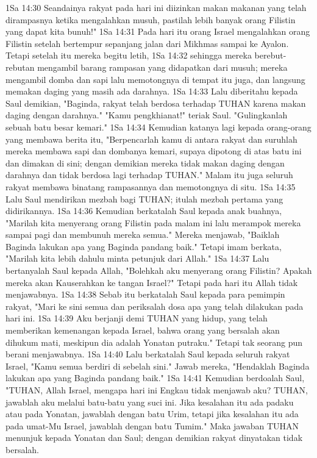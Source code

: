 1Sa 14:30  Seandainya rakyat pada hari ini diizinkan makan makanan yang telah dirampasnya ketika mengalahkan musuh, pastilah lebih banyak orang Filistin yang dapat kita bunuh!"
1Sa 14:31  Pada hari itu orang Israel mengalahkan orang Filistin setelah bertempur sepanjang jalan dari Mikhmas sampai ke Ayalon. Tetapi setelah itu mereka begitu letih,
1Sa 14:32  sehingga mereka berebut-rebutan mengambil barang rampasan yang didapatkan dari musuh; mereka mengambil domba dan sapi lalu memotongnya di tempat itu juga, dan langsung memakan daging yang masih ada darahnya.
1Sa 14:33  Lalu diberitahu kepada Saul demikian, "Baginda, rakyat telah berdosa terhadap TUHAN karena makan daging dengan darahnya." "Kamu pengkhianat!" teriak Saul. "Gulingkanlah sebuah batu besar kemari."
1Sa 14:34  Kemudian katanya lagi kepada orang-orang yang membawa berita itu, "Berpencarlah kamu di antara rakyat dan suruhlah mereka membawa sapi dan dombanya kemari, supaya dipotong di atas batu ini dan dimakan di sini; dengan demikian mereka tidak makan daging dengan darahnya dan tidak berdosa lagi terhadap TUHAN." Malam itu juga seluruh rakyat membawa binatang rampasannya dan memotongnya di situ.
1Sa 14:35  Lalu Saul mendirikan mezbah bagi TUHAN; itulah mezbah pertama yang didirikannya.
1Sa 14:36  Kemudian berkatalah Saul kepada anak buahnya, "Marilah kita menyerang orang Filistin pada malam ini lalu merampok mereka sampai pagi dan membunuh mereka semua." Mereka menjawab, "Baiklah Baginda lakukan apa yang Baginda pandang baik." Tetapi imam berkata, "Marilah kita lebih dahulu minta petunjuk dari Allah."
1Sa 14:37  Lalu bertanyalah Saul kepada Allah, "Bolehkah aku menyerang orang Filistin? Apakah mereka akan Kauserahkan ke tangan Israel?" Tetapi pada hari itu Allah tidak menjawabnya.
1Sa 14:38  Sebab itu berkatalah Saul kepada para pemimpin rakyat, "Mari ke sini semua dan periksalah dosa apa yang telah dilakukan pada hari ini.
1Sa 14:39  Aku berjanji demi TUHAN yang hidup, yang telah memberikan kemenangan kepada Israel, bahwa orang yang bersalah akan dihukum mati, meskipun dia adalah Yonatan putraku." Tetapi tak seorang pun berani menjawabnya.
1Sa 14:40  Lalu berkatalah Saul kepada seluruh rakyat Israel, "Kamu semua berdiri di sebelah sini." Jawab mereka, "Hendaklah Baginda lakukan apa yang Baginda pandang baik."
1Sa 14:41  Kemudian berdoalah Saul, "TUHAN, Allah Israel, mengapa hari ini Engkau tidak menjawab aku? TUHAN, jawablah aku melalui batu-batu yang suci ini. Jika kesalahan itu ada padaku atau pada Yonatan, jawablah dengan batu Urim, tetapi jika kesalahan itu ada pada umat-Mu Israel, jawablah dengan batu Tumim." Maka jawaban TUHAN menunjuk kepada Yonatan dan Saul; dengan demikian rakyat dinyatakan tidak bersalah.
